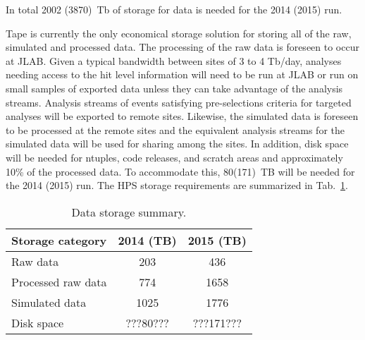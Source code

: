 In total 2002 (3870)~Tb of storage for data is needed for the 2014 (2015) run.

Tape is currently the only economical storage
solution for storing all of the raw, simulated and processed data.
The processing of the raw data is foreseen to occur at JLAB. Given a
typical bandwidth between sites of 3 to 4 Tb/day, analyses needing
access to the hit level information will need to be run at JLAB or run
on small samples of exported data unless they can take advantage of the
analysis streams. Analysis streams of events satisfying
pre-selections criteria for targeted analyses will be exported to remote
sites. Likewise, the simulated data is foreseen to be processed at the
remote sites and the equivalent analysis streams for the simulated data
will be used for sharing among the sites. In addition, disk space will be 
needed for ntuples, code releases, and scratch areas and approximately 10\% of the 
processed data. To accommodate this, 80(171)~TB will be needed for the 2014 (2015) run. 
The HPS storage requirements are summarized in Tab.~\ref{tab:datastorage}.
\begin{table}[tbp]
\centering
\begin{tabular}{|l|c|c|}
\hline
Storage category & 2014 (TB) & 2015 (TB) \\
\hline
Raw data & 203 & 436 \\
Processed raw data & 774 & 1658 \\
Simulated data & 1025 & 1776 \\
Disk space  & ???80???  & ???171??? \\
\hline
\end{tabular}
\caption{{\small Data storage summary.}}
\label{tab:datastorage}
\end{table}


